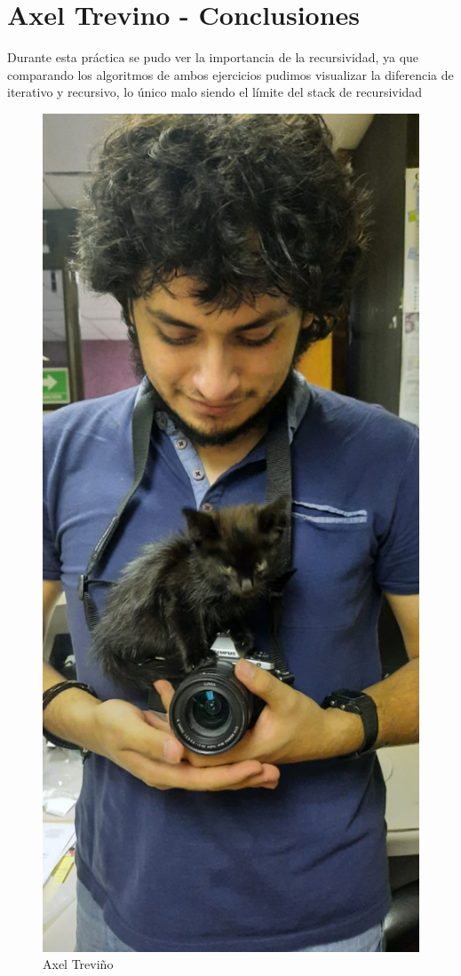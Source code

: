 \newpage
\section{Axel Trevino - Conclusiones}
    Durante esta práctica se pudo ver la importancia de la recursividad, ya que comparando los algoritmos de ambos ejercicios pudimos visualizar la diferencia de iterativo y recursivo, lo único malo siendo el límite del stack de recursividad
    \begin{figure}[htp!]
            \centering
            \includegraphics[width=0.4 \textwidth]{Images/Fotos_Alumnos/axel.jpg}  
            \caption{Axel Treviño}
            \label{fig:my_label2}
        \end{figure}
